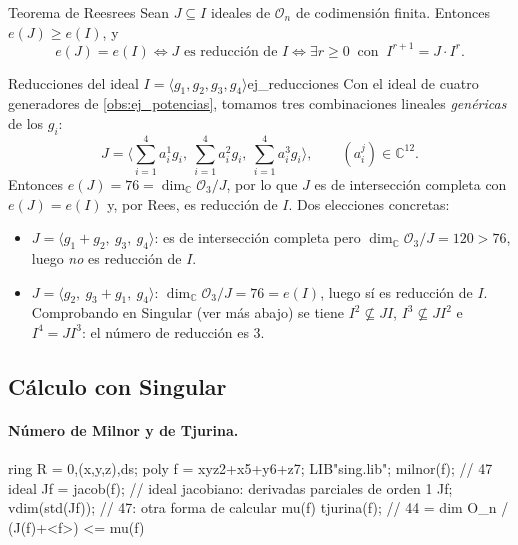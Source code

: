 \documentclass[11pt,a4paper]{article}
\begin{document}
\begin{teorema}{Teorema de Rees}{rees}
Sean $J \subseteq I$ ideales de $\mathcal{O}_n$ de codimensión finita. Entonces $e(J) \ge e(I)$, y
$$ e(J) = e(I) \iff J \text{ es reducción de } I \iff \exists r \ge 0 \ \text{ con } \ I^{r+1} = J \cdot I^r. $$
\end{teorema}

\begin{observacion}{Reducciones del ideal $I = \langle g_1,g_2,g_3,g_4\rangle$}{ej_reducciones}
Con el ideal de cuatro generadores de \cref{obs:ej_potencias}, tomamos tres combinaciones lineales \emph{genéricas} de los $g_i$:
$$ J = \Big\langle \sum_{i=1}^4 a^1_i g_i,\ \sum_{i=1}^4 a^2_i g_i,\ \sum_{i=1}^4 a^3_i g_i \Big\rangle, \qquad (a^j_i) \in \mathbb{C}^{12}. $$
Entonces $e(J) = 76 = \dim_{\mathbb{C}} \mathcal{O}_3 / J$, por lo que $J$ es de intersección completa con $e(J) = e(I)$ y, por Rees, es reducción de $I$. Dos elecciones concretas:
\begin{itemize}
    \item $J = \langle g_1 + g_2,\ g_3,\ g_4 \rangle$: es de intersección completa pero $\dim_{\mathbb{C}} \mathcal{O}_3/J = 120 > 76$, luego \emph{no} es reducción de $I$.
    \item $J = \langle g_2,\ g_3 + g_1,\ g_4 \rangle$: $\dim_{\mathbb{C}} \mathcal{O}_3/J = 76 = e(I)$, luego sí es reducción de $I$. Comprobando en Singular (ver más abajo) se tiene $I^2 \not\subseteq J I$, $I^3 \not\subseteq J I^2$ e $I^4 = J I^3$: el número de reducción es $3$.
\end{itemize}
\end{observacion}

\subsection*{Cálculo con Singular}

\paragraph{Número de Milnor y de Tjurina.}

\begin{singular}
ring R = 0,(x,y,z),ds;
poly f = xyz2+x5+y6+z7;
LIB"sing.lib";
milnor(f);                  // 47
ideal Jf = jacob(f);        // ideal jacobiano: derivadas parciales de orden 1
Jf;
vdim(std(Jf));              // 47: otra forma de calcular mu(f)
tjurina(f);                 // 44 = dim O_n / (J(f)+<f>) <= mu(f)
\end{singular}
\end{document}
